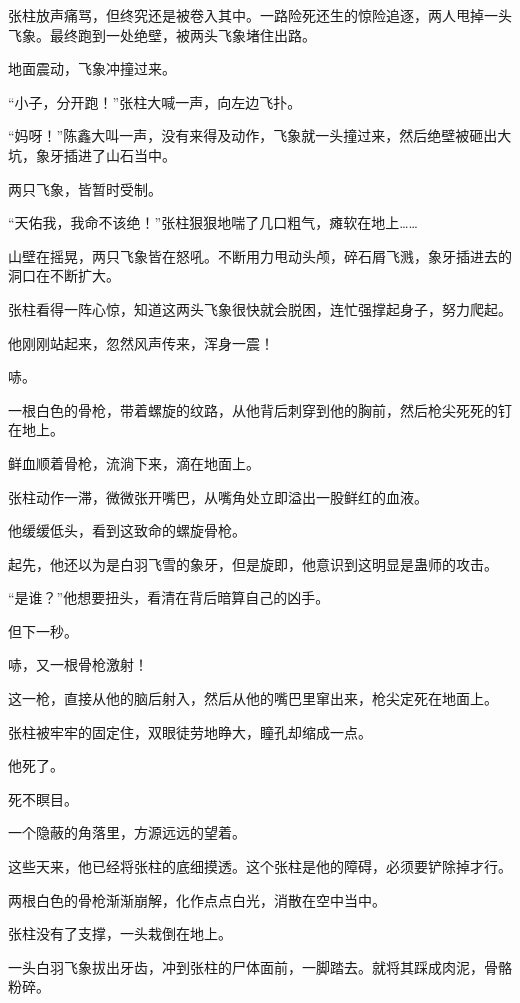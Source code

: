 
\begin{this_body}

张柱放声痛骂，但终究还是被卷入其中。一路险死还生的惊险追逐，两人甩掉一头飞象。最终跑到一处绝壁，被两头飞象堵住出路。

地面震动，飞象冲撞过来。

“小子，分开跑！”张柱大喊一声，向左边飞扑。

“妈呀！”陈鑫大叫一声，没有来得及动作，飞象就一头撞过来，然后绝壁被砸出大坑，象牙插进了山石当中。

两只飞象，皆暂时受制。

“天佑我，我命不该绝！”张柱狠狠地喘了几口粗气，瘫软在地上……

山壁在摇晃，两只飞象皆在怒吼。不断用力甩动头颅，碎石屑飞溅，象牙插进去的洞口在不断扩大。

张柱看得一阵心惊，知道这两头飞象很快就会脱困，连忙强撑起身子，努力爬起。

他刚刚站起来，忽然风声传来，浑身一震！

哧。

一根白色的骨枪，带着螺旋的纹路，从他背后刺穿到他的胸前，然后枪尖死死的钉在地上。

鲜血顺着骨枪，流淌下来，滴在地面上。

张柱动作一滞，微微张开嘴巴，从嘴角处立即溢出一股鲜红的血液。

他缓缓低头，看到这致命的螺旋骨枪。

起先，他还以为是白羽飞雪的象牙，但是旋即，他意识到这明显是蛊师的攻击。

“是谁？”他想要扭头，看清在背后暗算自己的凶手。

但下一秒。

哧，又一根骨枪激射！

这一枪，直接从他的脑后射入，然后从他的嘴巴里窜出来，枪尖定死在地面上。

张柱被牢牢的固定住，双眼徒劳地睁大，瞳孔却缩成一点。

他死了。

死不瞑目。

一个隐蔽的角落里，方源远远的望着。

这些天来，他已经将张柱的底细摸透。这个张柱是他的障碍，必须要铲除掉才行。

两根白色的骨枪渐渐崩解，化作点点白光，消散在空中当中。

张柱没有了支撑，一头栽倒在地上。

一头白羽飞象拔出牙齿，冲到张柱的尸体面前，一脚踏去。就将其踩成肉泥，骨骼粉碎。


\end{this_body}
